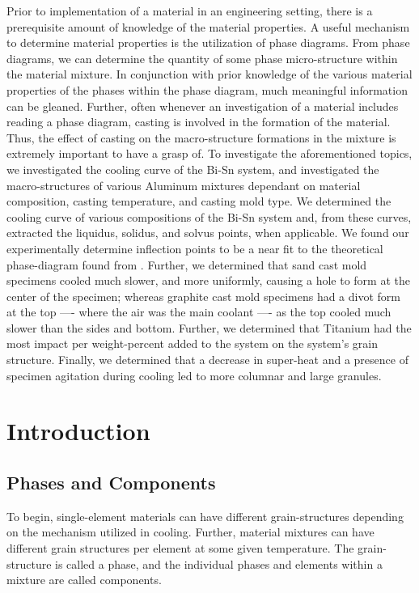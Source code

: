 \documentclass{article}
\begin{document}
Prior to implementation of a material in an engineering setting, there is a prerequisite amount of knowledge of the material properties. A useful mechanism to determine material properties is the utilization of phase diagrams. From phase diagrams, we can determine the quantity of some phase micro-structure within the material mixture. In conjunction with prior knowledge of the various material properties of the phases within the phase diagram, much meaningful information can be gleaned. Further, often whenever an investigation of a material includes reading a phase diagram, casting is involved in the formation of the material. Thus, the effect of casting on the macro-structure formations in the mixture is extremely important to have a grasp of. To investigate the aforementioned topics, we investigated the cooling curve of the Bi-Sn system, and investigated the macro-structures of various Aluminum mixtures dependant on material composition, casting temperature, and casting mold type. We determined the cooling curve of various compositions of the Bi-Sn system and, from these curves, extracted the liquidus, solidus, and solvus points, when applicable. We found our experimentally determine inflection points to be a near fit to the theoretical phase-diagram found from \cite{nist}. Further, we determined that sand cast mold specimens cooled much slower, and more uniformly, causing a hole to form at the center of the specimen; whereas graphite cast mold specimens had a divot form at the top ---- where the air was the main coolant ---- as the top cooled much slower than the sides and bottom. Further, we determined that Titanium had the most impact per weight-percent added to the system on the system's grain structure. Finally, we determined that a decrease in super-heat and a presence of specimen agitation during cooling led to more columnar and large granules. 


\newpage
\section{Introduction}
\subsection{Phases and Components}
To begin, single-element materials can have different grain-structures depending on the mechanism utilized in cooling. Further, material mixtures can have different grain structures per element at some given temperature. The grain-structure is called a phase, and the individual phases and elements within a mixture are called components. 
\end{document}
